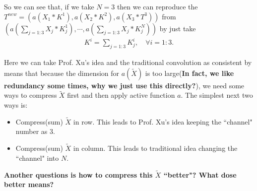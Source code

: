 So we can see that, if we take $ N = 3$ then we can reproduce the 
$T^{new} = (a(X_1 \ast K^1), a(X_2\ast K^2), a(X_3 \ast T^3))$ from $(a( \sum_{j=1:3} X_j\ast K_{j}^1), \cdots, a(\sum_{j=1:3} X_j\ast K_{j}^N))$ by just take
\begin{align}
	K^i = \sum_{j=1:3} K_j^i, \quad \forall i = 1:3.
\end{align}

\begin{remark}
	Here we can take Prof. Xu's idea and the traditional convolution as consistent by means that because the dimension for $a(\tilde{X})$ is too large({\bf In fact, we like redundancy some times, why we just use this directly?}), we need some ways to compress $\tilde{X}$ first and then apply active function $a$. The simplest next two ways is:
	\begin{itemize}
		\item Compress(sum) $\tilde{X}$ in row. This leads to Prof. Xu's idea keeping the ``channel" number as 3.
		\item Compress(sum) $\tilde{X}$ in column. This leads to traditional idea changing the ``channel" into $N$.
	\end{itemize}
	
	{\bf Another questions is how to compress this $\tilde{X}$ ``better"?  What dose better means?}
	
\end{remark}




